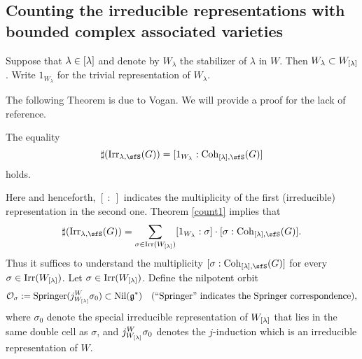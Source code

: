 \documentclass[counting_main.tex]{subfiles}
\begin{document}
\subsection{Counting the irreducible representations with bounded complex associated varieties}

Suppose that $\lambda\in {[\lambda]}$ and denote by $W_\lambda$ the stabilizer of $\lambda$ in $W$. Then $W_\lambda\subset W_{[\lambda]}$. Write $1_{W_\lambda}$  for the trivial representation of $W_{\lambda}$.

The following Theorem is due to Vogan. We will provide a proof for the lack of reference.
\begin{thm}\label{count1}
The equality
  \[
    \sharp(\Irr_{\lambda,\sfS}(G)) = [1_{W_{\lambda}}:\Coh_{\Lam,\sfS}(G)]
  \]
  holds.
\end{thm}
Here and henceforth, $[\ : \ ]$ indicates the multiplicity of the first (irreducible) representation in the second one.
Theorem \ref{count1} implies that
 \begin{equation}\label{countlg}
    \sharp(\Irr_{\lambda,\sfS}(G)) = \sum_{\sigma\in \Irr(W_\Lam)} [1_{W_{\lambda}}: \sigma]\cdot [\sigma: \Coh_{\Lam,\sfS}(G)].
  \end{equation}
Thus it suffices to understand the multiplicity $ [\sigma: \Coh_{\Lam,\sfS}(G)]$ for every $\sigma\in \mathrm{Irr}(W_{[\lambda]})$.  Let $\sigma\in  \mathrm{Irr}(W_{[\lambda]})$.  Define the nilpotent orbit
\[
{\mathcal {O}}_\sigma:=\mathrm{Springer}(j_{W_{[\lambda]}}^W \sigma_0)\subset \mathrm{Nil}(\mathfrak g^*) \quad (``\mathrm{Springer}"\textrm{ indicates the Springer correspondence}),
\]
where  $\sigma_0$ denote the special irreducible representation of $W_{[\lambda]}$ that lies in the same double cell as  $\sigma$, and $j_{W_{[\lambda]}}^W \sigma_0$ denotes the $j$-induction which is an irreducible representation of $W$.

\end{document}
